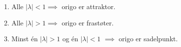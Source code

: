 \begin{enumerate}
  \item Alle $|\lambda| < 1 \implies$ origo er attraktor.
  \item Alle $|\lambda| > 1 \implies$ origo er frastøter.
  \item Minst én $|\lambda| > 1$ og én $|\lambda|< 1$
        $\implies$ origo er sadelpunkt.
\end{enumerate}
